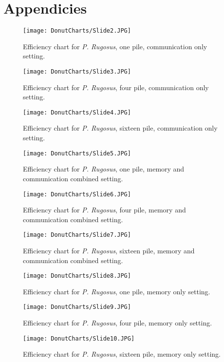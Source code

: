 \chapter{Appendicies}
\begin{figure}[h]
	\texttt{[image: DonutCharts/Slide2.JPG]}
	\caption{Efficiency chart for \textit{P. Rugosus}, one pile,  communication only setting.}
\end{figure}
\begin{figure}[h]
	\texttt{[image: DonutCharts/Slide3.JPG]}
\caption{Efficiency chart for \textit{P. Rugosus}, four pile,  communication only setting.}
\end{figure}
\begin{figure}[h]
	\texttt{[image: DonutCharts/Slide4.JPG]}
	\caption{Efficiency chart for \textit{P. Rugosus}, sixteen pile,  communication only setting.}
\end{figure}
\begin{figure}[h]
	\texttt{[image: DonutCharts/Slide5.JPG]}
	\caption{Efficiency chart for \textit{P. Rugosus}, one pile,  memory and communication combined setting.}
\end{figure}
\begin{figure}[h]
	\texttt{[image: DonutCharts/Slide6.JPG]}
	\caption{Efficiency chart for \textit{P. Rugosus}, four pile, memory and communication combined setting.}
\end{figure}
\begin{figure}[h]
	\texttt{[image: DonutCharts/Slide7.JPG]}
	\caption{Efficiency chart for \textit{P. Rugosus}, sixteen pile,  memory and communication combined setting.}
\end{figure}
\begin{figure}[h]
	\texttt{[image: DonutCharts/Slide8.JPG]}
	\caption{Efficiency chart for \textit{P. Rugosus}, one pile,  memory only setting.}
\end{figure}
\begin{figure}[h]
	\texttt{[image: DonutCharts/Slide9.JPG]}
	\caption{Efficiency chart for \textit{P. Rugosus}, four pile,  memory only setting.}
\end{figure}
\begin{figure}[h]
	\texttt{[image: DonutCharts/Slide10.JPG]}
	\caption{Efficiency chart for \textit{P. Rugosus}, sixteen pile,  memory only setting.}
\end{figure}
